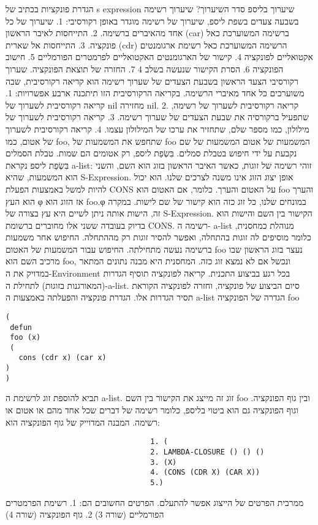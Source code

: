 \begin{טבלא}[!htbp]
      הגדרת פונקציות בכתיב של s expression
      שיערוך בליספ
      סדר השיערוך?
      שיערוך רשימה בשבעה צעדים
      בשפת ליספ, שיערוך של רשימה מוגדר באופן רקורסיבי:
      1. שיערוך של כל אחד מהאיברים ברשימה.
      2. התייחסות לאיבר הראשון (car) ברשימה המשוערכת כאל פונקציה.
      3. התייחסות אל שארית (cdr) הרשימה המשוערכת כאל רשימת ארגומנטים אקטואליים לפונקציה
      4. קישור של הארגומנטים האקטואליים לפרמטרים הפורמליים
      5. חישוב הפונקציה
      6. הסרת הקישור שנעשה בשלב 4
      7. החזרה של תוצאת הפונקציה.
      שערוך רקורסיבי
      הצעד הראשון בשבעת הצעדים של שערוך רשימה הוא קריאה רקורסיבית, שבה משוערכים כל אחד מאיברי הרשימה. בקריאה הרקורסיבית הזו תיתכנה ארבע אפשרויות:
      1. קריאה רקורסיבית לשערוך של nil מחזירה nil.
      2. קריאה רקורסיבית לשערוך של רשימה, שתפעיל ברקורסיה את שבעת הצעדים של שערוך רשימה.
      3. קריאה רקורסיבית לשערוך של מילולון, כמו מספר שלם, שתחזיר את ערכו של המילולון עצמו.
      4. קריאה רקורסיבית לשערוך של אטום, כמו foo, שתחפש את המשמעות של foo
      המשמעות של אטום המשמעות של שם נקבעת על ידי חיפוש בטבלת סמלים. בִּשְׂפַת ליספ, רק
      אטומים הם שמות. טבלת הסמלים בִּשְׂפַת ליספ נקראת a-list: זוהי רשימה של זוגות, כאשר
      האיבר הראשון בזוג הוא השם, והשני הוא המשמעות, שהיא S-Expression. אופן יצוג
      הזוג אינו משנה לצרכים שלנו. הוא יכול להיות למשל באמצעות הפעלת CONS על האטום
      והערך. כלומר, אם האטום הוא foo והערך הוא העץ φ אז הזוג הוא foo.φ במונחים שלנו,
      כל זוג כזה הוא קישור של שם לישות. במקרה זה, הישות אותה ניתן לשיים היא עץ בצורה
      של S-Expression. הקישור בין השם והישות הוא בדיוק בעובדה ששני אלו מחוברים ברשומת
      CONS. רשימה ה- a-list מנוהלת כמחסנית, כלומר מוסיפים לה זוגות בהתחלה, ואפשר
      להסיר זוגות רק מההתחלה. החיפוש אחר משמעות ברשימה נעשה מתחילתה. החיפוש עבור
      המשמעות של האטום foo נעצר בזוג הראשון שבו מרכיב השם הוא foo, ונכשל אם לא נמצא
      זוג כזה. המחסנית היא מבנה נתונים המתאר במדויק את ה-Environment בכל רגע בביצוע
      התכנית. קריאה לפונקציה תוסיף הגדרות (המאורגנות בזוגות) לתחילת ה-a-list. סיום
      הביצוע של פונקציה, וחזרה לפונקציה הקוראת תסיר הגדרות אלו. הגדרת פונקציה
      והפעלתה באמצעות ה a-list הגדרה של הפונקציה foo
\begin{verbatim}
(
 defun
 foo (x)
 (
   cons (cdr x) (car x)
)
)
\end{verbatim}

      תביא להוספת זוג לרשימת ה a-list. זוג זה מייצג את הקישור בין השם foo ובין גוף הפונקציה. וגוף הפונקציה גם הוא ביטוי בליספ, כלומר רשימה של דברים שכל אחד מהם או אטום או רשימה.
      המבנה המדוייק של גוף הפונקציה הוא:
\begin{verbatim}
                                 1. (
                                 2. LAMBDA-CLOSURE () () ()
                                 3. (X)
                                 4. (CONS (CDR X) (CAR X))
                                 5.)
\end{verbatim}
      ממרבית הפרטים של הייצוג אפשר להתעלם. הפרטים החשובים הם:
      1. רשימת הפרמטרים הפורמליים (שורה 3)
      2. גוף הפונקציה (שורה 4)


\end{טבלא}
